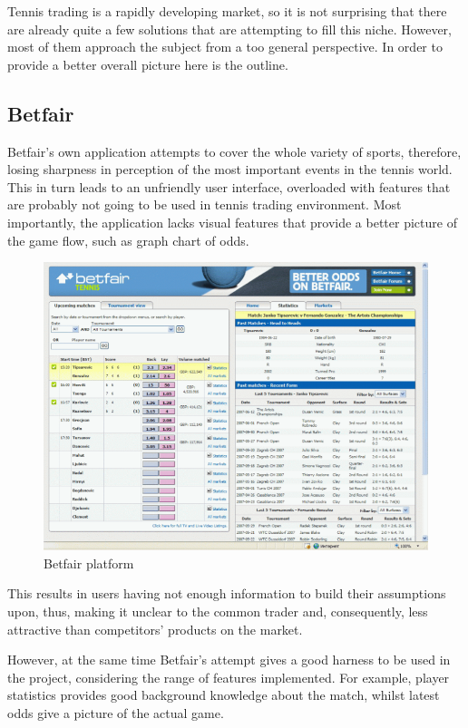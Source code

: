 \documentclass[10pt]{report}
\begin{document}
Tennis trading is a rapidly developing market, so it is not surprising that there are already quite a few solutions 
that are attempting to fill this niche. However, most of them approach the subject from a too general perspective. 
In order to provide a better overall picture here is the outline.

\subsection{Betfair}

Betfair's own application attempts to cover the whole variety of sports, therefore, losing sharpness in perception 
of the most important events in the tennis world. This in turn leads to an unfriendly user interface, overloaded with 
features that are probably not going to be used in tennis trading environment. Most importantly, the application lacks 
visual features that provide a better picture of the game flow, such as graph chart of odds.

\begin{figure}[h]
\begin{center}
\includegraphics[scale = 0.36]{betfair.png}
\end{center}
\caption{Betfair platform}
\end{figure}

This results in users having not enough information to build their assumptions upon, thus, making it unclear to the 
common trader and, consequently, less attractive than competitors' products on the market.

However, at the same time Betfair's attempt gives a good harness to be used in the project, considering the range of 
features implemented. For example, player statistics provides good background knowledge about the match, whilst latest 
odds give a picture of the actual game.
\end{document}
